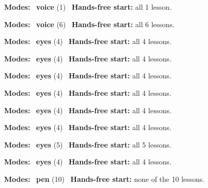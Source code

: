 \expandafter\def\csname hlchaptermodality6\endcsname{%
  {\small\noindent
    \textbf{Modes:} \hlvoicesign{}~\textbf{voice} (1)\quad
    \hlvoicesign{}~\textbf{Hands-free start:} all 1 lesson.%
    \par}\medskip
}

\expandafter\def\csname hlchaptermodality7\endcsname{%
  {\small\noindent
    \textbf{Modes:} \hlvoicesign{}~\textbf{voice} (6)\quad
    \hlvoicesign{}~\textbf{Hands-free start:} all 6 lessons.%
    \par}\medskip
}

\expandafter\def\csname hlchaptermodality8\endcsname{%
  {\small\noindent
    \textbf{Modes:} \hlsightsign{}~\textbf{eyes} (4)\quad
    \hlvoicesign{}~\textbf{Hands-free start:} all 4 lessons.%
    \par}\medskip
}

\expandafter\def\csname hlchaptermodality9\endcsname{%
  {\small\noindent
    \textbf{Modes:} \hlsightsign{}~\textbf{eyes} (4)\quad
    \hlvoicesign{}~\textbf{Hands-free start:} all 4 lessons.%
    \par}\medskip
}

\expandafter\def\csname hlchaptermodality10\endcsname{%
  {\small\noindent
    \textbf{Modes:} \hlsightsign{}~\textbf{eyes} (4)\quad
    \hlvoicesign{}~\textbf{Hands-free start:} all 4 lessons.%
    \par}\medskip
}

\expandafter\def\csname hlchaptermodality11\endcsname{%
  {\small\noindent
    \textbf{Modes:} \hlsightsign{}~\textbf{eyes} (4)\quad
    \hlvoicesign{}~\textbf{Hands-free start:} all 4 lessons.%
    \par}\medskip
}

\expandafter\def\csname hlchaptermodality12\endcsname{%
  {\small\noindent
    \textbf{Modes:} \hlsightsign{}~\textbf{eyes} (4)\quad
    \hlvoicesign{}~\textbf{Hands-free start:} all 4 lessons.%
    \par}\medskip
}

\expandafter\def\csname hlchaptermodality13\endcsname{%
  {\small\noindent
    \textbf{Modes:} \hlsightsign{}~\textbf{eyes} (4)\quad
    \hlvoicesign{}~\textbf{Hands-free start:} all 4 lessons.%
    \par}\medskip
}

\expandafter\def\csname hlchaptermodality14\endcsname{%
  {\small\noindent
    \textbf{Modes:} \hlsightsign{}~\textbf{eyes} (5)\quad
    \hlvoicesign{}~\textbf{Hands-free start:} all 5 lessons.%
    \par}\medskip
}

\expandafter\def\csname hlchaptermodality15\endcsname{%
  {\small\noindent
    \textbf{Modes:} \hlsightsign{}~\textbf{eyes} (4)\quad
    \hlvoicesign{}~\textbf{Hands-free start:} all 4 lessons.%
    \par}\medskip
}

\expandafter\def\csname hlchaptermodality16\endcsname{%
  {\small\noindent
    \textbf{Modes:} \hlpensign{}~\textbf{pen} (10)\quad
    \hlvoicesign{}~\textbf{Hands-free start:} none of the 10 lessons.%
    \par}\medskip
}
